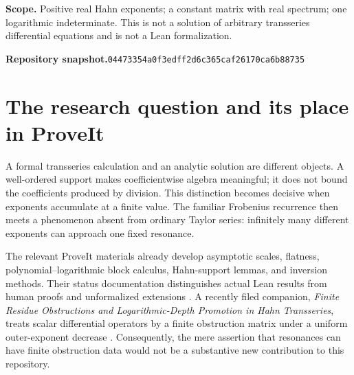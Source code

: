 \documentclass[11pt,a4paper]{article}
\numberwithin{equation}{section}
\theoremstyle{definition}
\theoremstyle{remark}
\newcommand{\snap}{\texttt{04473354a0f3edff2d6c365caf26170ca6b88735}}
\begin{document}
\begin{titlepage}
\begin{abstract}
An explicit two-dimensional family has coefficient weights $n^{-p}$ and
exponents $2-1/n$. Its formal normalizer converges exactly when $p>2$,
although a renormalized analytic solution exists for every $p>1$ and realizes
all finite asymptotic prefixes. We derive its truncation crossover on the
scale $N\asymp\log(1/x)$, including a uniform Euler--Maclaurin error bound.
All general claims are proved conventionally. Reproducible finite symbolic
checks and numerical illustrations accompany the article. Classical
Fuchsian normal forms and the repository's earlier finite-obstruction work
are explicitly acknowledged; an exhaustive claim of historical priority is
not made.
\end{abstract}
\vfill
\noindent\small
\textbf{Scope.} Positive real Hahn exponents; a constant matrix with real
spectrum; one logarithmic indeterminate. This is not a solution of arbitrary
transseries differential equations and is not a Lean formalization.\par
\vspace{2mm}
\noindent\small
\textbf{Repository snapshot.}\quad\snap
\end{titlepage}
\hypersetup{pageanchor=true}
\tableofcontents
\newpage

\section{The research question and its place in ProveIt}
\label{sec:intro}

A formal transseries calculation and an analytic solution are different
objects. A well-ordered support makes coefficientwise algebra meaningful;
it does not bound the coefficients produced by division. This distinction
becomes decisive when exponents accumulate at a finite value. The familiar
Frobenius recurrence then meets a phenomenon absent from ordinary Taylor
series: infinitely many different exponents can approach one fixed
resonance.

The relevant ProveIt materials already develop asymptotic scales,
flatness, polynomial--logarithmic block calculus, Hahn-support lemmas, and
inversion methods. Their status documentation distinguishes actual Lean
results from human proofs and unformalized extensions
\cite{repo-index,repo-wellbased,repo-block}. A recently filed companion,
\emph{Finite Residue Obstructions and Logarithmic-Depth Promotion in Hahn
Transseries}, treats scalar differential operators by a finite obstruction
matrix under a uniform outer-exponent decrease \cite{repo-residue}.
Consequently, the mere assertion that resonances can have finite
obstruction data would not be a substantive new contribution to this
repository.
\end{document}
